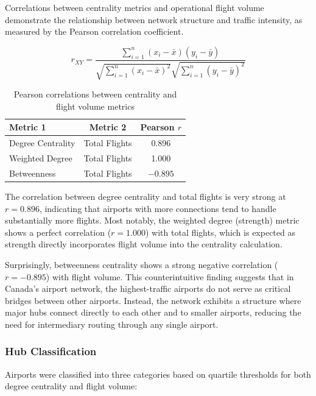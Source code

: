 \documentclass[10pt]{article}
\begin{document}
Correlations between centrality metrics and operational flight volume demonstrate the relationship between network structure and traffic intensity, as measured by the Pearson correlation coefficient.

\[
r_{XY}
=
\frac{\displaystyle\sum_{i=1}^{n} (x_i - \bar{x})(y_i - \bar{y})}
     {\sqrt{\displaystyle\sum_{i=1}^{n} (x_i - \bar{x})^2}
      \sqrt{\displaystyle\sum_{i=1}^{n} (y_i - \bar{y})^2}}
\]

\begin{table}[h!]
    \centering
    \caption{Pearson correlations between centrality and flight volume metrics}
    \begin{tabular}{lcc}
        \toprule
        Metric 1 & Metric 2 & Pearson $r$ \\
        \midrule
        Degree Centrality & Total Flights      & 0.896 \\
        Weighted Degree   & Total Flights      & 1.000 \\
        Betweenness       & Total Flights      & $-0.895$ \\
        \bottomrule
    \end{tabular}
\end{table}

The correlation between degree centrality and total flights is very strong at $r = 0.896$, indicating that airports with more connections tend to handle substantially more flights. Most notably, the weighted degree (strength) metric shows a perfect correlation ($r = 1.000$) with total flights, which is expected as strength directly incorporates flight volume into the centrality calculation.

Surprisingly, betweenness centrality shows a strong negative correlation ($r = -0.895$) with flight volume. This counterintuitive finding suggests that in Canada's airport network, the highest-traffic airports do not serve as critical bridges between other airports. Instead, the network exhibits a structure where major hubs connect directly to each other and to smaller airports, reducing the need for intermediary routing through any single airport.

\subsubsection{Hub Classification}

Airports were classified into three categories based on quartile thresholds for both degree centrality and flight volume:
\end{document}
